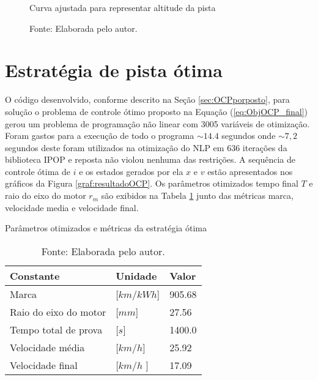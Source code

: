 \begin{figure}[h]
    \centering
    \caption{Curva ajustada para representar altitude da pista}
    
    \label{graf:modelo_pista}
    \caption*{\footnotesize{Fonte: Elaborada pelo autor.}}
\end{figure}


%     

%     

\section{Estratégia de pista ótima}
\label{sec:resultados_otimo}
 
O código desenvolvido, conforme descrito na Seção \ref{sec:OCPporposto}, para solução o problema de controle ótimo proposto na Equação 
(\ref{eq:ObjOCP_final}) gerou um problema de programação não linear com 3005 variáveis de otimização.
Foram gastos para a execução de todo o programa $\sim 14.4$ segundos onde $\sim 7,2$ segundos deste foram utilizados na otimização do NLP em $636$ iterações da biblioteca IPOP e reposta não violou nenhuma das restrições. 
A sequência de controle ótima de $i$ e os estados gerados por ela $x$ e $v$ estão apresentados nos gráficos da Figura \ref{graf:resultadoOCP}. 
Os parâmetros otimizados tempo final $T$ e raio do eixo do motor $r_m$ são exibidos na Tabela \ref{tab:resultadoOCP} junto das métricas marca, velocidade media e velocidade final. 

\begin{table}[h]
	\centering
	\caption{Parâmetros otimizados e métricas da estratégia ótima}
	\begin{tabular}{lll}
		\toprule
		\textbf{Constante} & \textbf{Unidade} & \textbf{Valor}\\
		\hline
		Marca                               & [$km/kWh$]   & 905.68  \\
        Raio do eixo do motor               & [$mm$]       & 27.56   \\
        Tempo total de prova                & [$s$]        & 1400.0  \\  
        Velocidade média                    & [$km/h$]     & 25.92   \\
        Velocidade final                    & [$km/h$ ]    & 17.09   \\
		\bottomrule
	\end{tabular}
	\caption*{\footnotesize Fonte: Elaborada pelo autor.}
	\label{tab:resultadoOCP}
\end{table}

